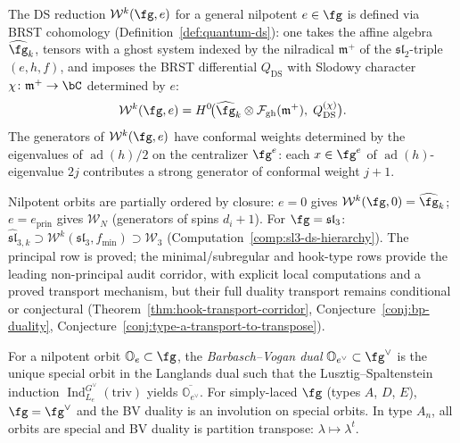 The DS reduction $\mathcal{W}^k(\fg, e)$ for a general nilpotent
$e \in \fg$ is defined via BRST cohomology
(Definition~\ref{def:quantum-ds}): one takes the affine algebra
$\widehat{\fg}_k$, tensors with a ghost system indexed by the nilradical
$\mathfrak{m}^+$ of the $\mathfrak{sl}_2$-triple $(e, h, f)$, and
imposes the BRST differential $Q_{\mathrm{DS}}$ with Slodowy character
$\chi \colon \mathfrak{m}^+ \to \bC$ determined by $e$:
\begin{equation}\label{eq:general-ds}
\mathcal{W}^k(\fg, e) = H^0\!\bigl(
\widehat{\fg}_k \otimes \mathcal{F}_{\mathrm{gh}}(\mathfrak{m}^+),\;
Q_{\mathrm{DS}}^{(\chi)}\bigr).
\end{equation}
The generators of $\mathcal{W}^k(\fg, e)$ have conformal weights
determined by the eigenvalues of $\operatorname{ad}(h)/2$ on the
centralizer $\fg^e$: each $x \in \fg^e$ of $\operatorname{ad}(h)$-eigenvalue
$2j$ contributes a strong generator of conformal weight $j + 1$.

\begin{remark}
\label{rem:ds-hierarchy-summary}
Nilpotent orbits are partially ordered by closure: $e = 0$ gives $\mathcal{W}^k(\fg, 0) = \widehat{\fg}_k$; $e = e_{\mathrm{prin}}$ gives $\mathcal{W}_N$ (generators of spins $d_i + 1$).  For $\fg = \mathfrak{sl}_3$: $\widehat{\mathfrak{sl}}_{3,k} \supset \mathcal{W}^k(\mathfrak{sl}_3, f_{\min}) \supset \mathcal{W}_3$ (Computation~\ref{comp:sl3-ds-hierarchy}).  The principal row is proved; the minimal/subregular and hook-type rows provide the leading non-principal audit corridor, with explicit local computations and a proved transport mechanism, but their full duality transport remains conditional or conjectural (Theorem~\ref{thm:hook-transport-corridor}, Conjecture~\ref{conj:bp-duality}, Conjecture~\ref{conj:type-a-transport-to-transpose}).
\end{remark}

\begin{definition}
\label{def:bv-dual}
For a nilpotent orbit $\mathbb{O}_e \subset \fg$, the
\emph{Barbasch--Vogan dual} $\mathbb{O}_{e^\vee} \subset \fg^\vee$ is
the unique special orbit in the Langlands dual such that
the Lusztig--Spaltenstein induction
$\operatorname{Ind}_{L_e}^{G^\vee}(\mathrm{triv})$ yields
$\overline{\mathbb{O}_{e^\vee}}$.  For simply-laced $\fg$
(types $A$, $D$, $E$), $\fg = \fg^\vee$ and the BV duality is an
involution on special orbits.  In type $A_n$, all orbits are special
and BV duality is partition transpose: $\lambda \mapsto \lambda^t$.
\end{definition}

